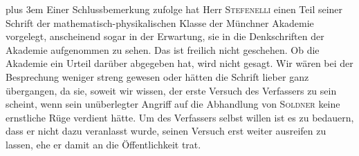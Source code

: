 \begingroup\rightskip=0pt plus 3em
Einer Schlussbemerkung zufolge hat Herr \textsc{Stefenelli} einen Teil seiner Schrift der mathematisch-physikalischen Klasse der Münchner Akademie vorgelegt, anscheinend sogar in der Erwartung, sie in die Denkschriften der Akademie aufgenommen zu sehen. Das ist freilich nicht geschehen. Ob die Akademie ein Urteil darüber abgegeben hat, wird nicht gesagt. Wir wären bei der Besprechung weniger streng gewesen oder hätten die Schrift lieber ganz übergangen, da sie, soweit wir wissen, der erste Versuch des Verfassers zu sein scheint, wenn sein unüberlegter Angriff auf die Abhandlung von \textsc{Soldner} keine ernstliche Rüge verdient hätte. Um des Verfassers selbst willen ist es zu bedauern, dass er nicht dazu veranlasst wurde, seinen Versuch erst weiter ausreifen zu lassen, ehe er damit an die Öffentlichkeit trat.\par\endgroup
